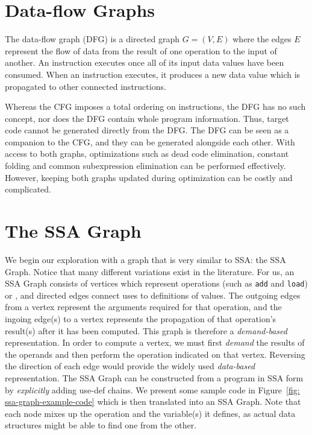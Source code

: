 \section{Data-flow Graphs}
The data-flow graph (DFG) is a directed graph $G=(V,E)$ where the edges $E$ represent the flow of data from the result of one operation to the input of another. 
An instruction executes once all of its input data values have been consumed. 
When an instruction executes, it produces a new data value which is propagated to other connected instructions.

Whereas the CFG imposes a total ordering on instructions, the DFG has no such concept, nor does the DFG contain whole program information. 
Thus, target code cannot be generated directly from the DFG. 
The DFG can be seen as a companion to the CFG, and they can be generated alongside each other. 
With access to both graphs, optimizations such as dead code elimination, constant folding and common subexpression elimination can be performed effectively. 
However, keeping both graphs updated during optimization can be costly and complicated.

\section{The SSA Graph}

We begin our exploration with a graph that is very similar to SSA: 
the SSA Graph. 
Notice that many different variations exist in the literature. 
For us, an SSA Graph consists of vertices which represent operations (such as \texttt{add} and \texttt{load}) or \phifuns, and directed edges connect uses to definitions of values. 
The outgoing edges from a vertex represent the arguments required for that operation, and the ingoing edge(s) to a vertex represents the propagation of that operation's result(s) after it has been computed. 
This graph is therefore a \textit{demand-based} representation. 
In order to compute a vertex, we must first \textit{demand} the results of the operands and then perform the operation indicated on that vertex. 
Reversing the direction of each edge would provide the widely used \emph{data-based} representation. 
The SSA Graph can be constructed from a program in SSA form by \textit{explicitly} adding use-def chains. 
We present some sample code in Figure~\ref{fig: 
  ssa-graph-example-code} which is then translated into an SSA Graph.
Note that each node mixes up the operation and the variable(s) it defines, as actual data structures might be able to find one from the other.

